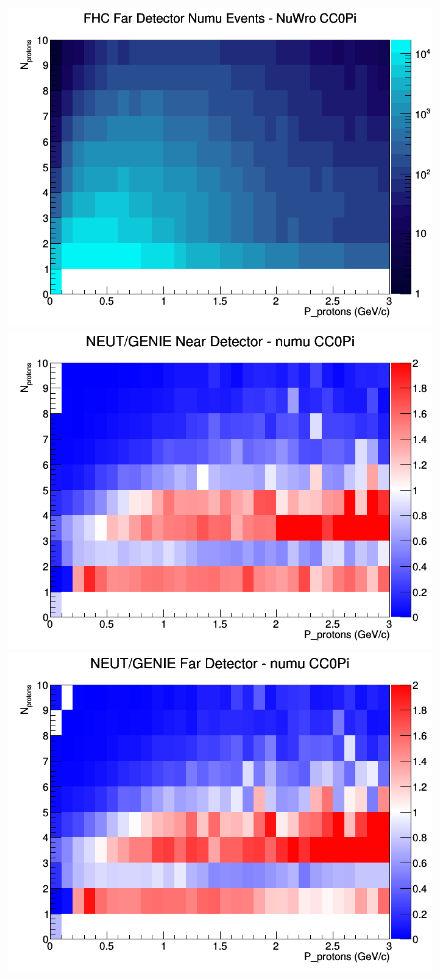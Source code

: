 \begin{figure}[h]
\endminipage
{}
\includegraphics[width=\linewidth]{N_P/nominal/protons/CC0Pi_FHC_FD_numu_N_P_NuWro.png}
\endminipage
\newline
{}
\includegraphics[width=\linewidth]{N_P/nominal/protons/ratios/CC0Pi_NEUT_GENIE_numu_near_N_P.png}
\endminipage
{}
\includegraphics[width=\linewidth]{N_P/nominal/protons/ratios/CC0Pi_NEUT_GENIE_numu_far_N_P.png}

\end{figure}
